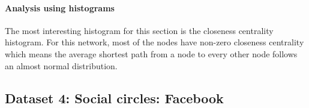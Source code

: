 \documentclass[letterpaper, 11pt]{article}
\newcommand{\1}{\mathds{1}}	%
\theoremstyle{definition}
\begin{document}
\paragraph{Analysis using histograms}The most interesting histogram for this section is the closeness centrality histogram. For this network, most of the nodes have non-zero closeness centrality which means the average shortest path from a node to every other node follows an almost normal distribution.
\newpage
\subsection*{Dataset 4: Social circles: Facebook}
\end{document}
